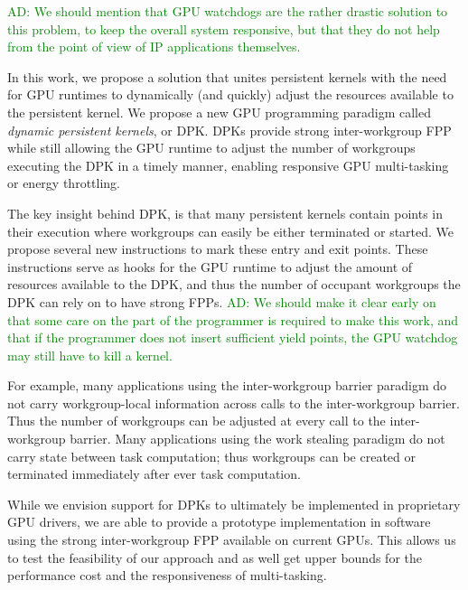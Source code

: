 \documentclass[numbers,nocopyrightspace,10pt]{sigplanconf}
\newcommand{\ADComment}[1]{\textcolor{green}{AD: #1}}
\begin{document}
\ADComment{We should mention that GPU watchdogs are the rather drastic solution to this problem, to keep the overall system responsive, but that they do not help from the point of view of IP applications themselves.}

In this work, we propose a solution that unites persistent kernels
with the need for GPU runtimes to dynamically (and quickly) adjust the
resources available to the persistent kernel. We propose a new GPU
programming paradigm called \emph{dynamic persistent kernels}, or
DPK. DPKs provide strong inter-workgroup FPP while still allowing the
GPU runtime to adjust the number of workgroups executing the DPK in a
timely manner, enabling responsive GPU multi-tasking or energy
throttling.

The key insight behind DPK, is that many persistent kernels contain
points in their execution where workgroups can easily be either
terminated or started. We propose several new instructions to mark
these entry and exit points. These instructions serve as hooks for the
GPU runtime to adjust the amount of resources available to the DPK,
and thus the number of occupant workgroups the DPK can rely on to have
strong FPPs. \ADComment{We should make it clear early on that some care on the part of the programmer is required to make this work, and that if the programmer does not insert sufficient yield points, the GPU watchdog may still have to kill a kernel.}

For example, many applications using the inter-workgroup barrier
paradigm do not carry workgroup-local information across calls to the
inter-workgroup barrier. Thus the number of workgroups can be adjusted
at every call to the inter-workgroup barrier. Many applications using
the work stealing paradigm do not carry state between task
computation; thus workgroups can be created or terminated immediately
after ever task computation.

While we envision support for DPKs to ultimately be implemented in
proprietary GPU drivers, we are able to provide a prototype
implementation in software using the strong inter-workgroup FPP
available on current GPUs. This allows us to test the feasibility of
our approach and as well get upper bounds for the performance cost and
the responsiveness of multi-tasking.
\end{document}
